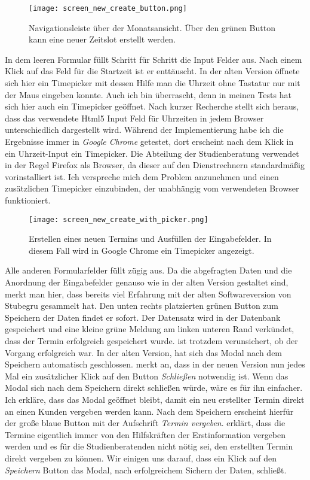 \begin{figure}[H]
    \caption{Navigationsleiste über der Monatsansicht. Über den grünen Button kann eine neuer Zeitslot erstellt werden.}
    \centering
    \texttt{[image: screen\_new\_create\_button.png]}
\end{figure}

In dem leeren Formular füllt \ipName Schritt für Schritt die Input Felder aus.
Nach einem Klick auf das Feld für die Startzeit ist er enttäuscht. In der alten
Version öffnete sich hier ein \gls{Timepicker} mit dessen Hilfe man die Uhrzeit
ohne Tastatur nur mit der Maus eingeben konnte. Auch ich bin überrascht, denn
in meinen Tests hat sich hier auch ein Timepicker geöffnet. Nach kurzer
Recherche stellt sich heraus, dass das verwendete Html5 Input Feld für
Uhrzeiten in jedem Browser unterschiedlich dargestellt
wird\cite{htmlTimeInput}. Während der Implementierung habe ich die Ergebnisse
immer in \textit{Google Chrome} getestet, dort erscheint nach dem Klick in ein
Uhrzeit-Input ein Timepicker. Die Abteilung der Studienberatung verwendet in
der Regel Firefox als Browser, da dieser auf den Dienstrechnern standardmäßig
vorinstalliert ist. Ich verspreche mich dem Problem anzunehmen und einen
zusätzlichen Timepicker einzubinden, der unabhängig vom verwendeten Browser
funktioniert.

\begin{figure}[H]
    \caption{Erstellen eines neuen Termins und Ausfüllen der Eingabefelder. In diesem Fall wird in Google Chrome ein Timepicker angezeigt.}
    \centering
    \texttt{[image: screen\_new\_create\_with\_picker.png]}
\end{figure}

Alle anderen Formularfelder füllt \ipName zügig aus. Da die abgefragten Daten
und die Anordnung der Eingabefelder genauso wie in der alten Version gestaltet
sind, merkt man hier, dass \ipName bereits viel Erfahrung mit der alten
Softwareversion von Stubegru gesammelt hat. Den unten rechts platzierten grünen
Button zum Speichern der Daten findet er sofort. Der Datensatz wird in der
Datenbank gespeichert und eine kleine grüne Meldung am linken unteren Rand
verkündet, dass der Termin erfolgreich gespeichert wurde. \ipName ist trotzdem
verunsichert, ob der Vorgang erfolgreich war. In der alten Version, hat sich
das Modal nach dem Speichern automatisch geschlossen. \ipName merkt an, dass in
der neuen Version nun jedes Mal ein zusätzlicher Klick auf den Button
\textit{Schließen} notwendig ist. Wenn das Modal sich nach dem Speichern direkt
schließen würde, wäre es für ihn einfacher. Ich erkläre, dass das Modal
geöffnet bleibt, damit ein neu erstellter Termin direkt an einen Kunden
vergeben werden kann. Nach dem Speichern erscheint hierfür der große blaue
Button mit der Aufschrift \textit{Termin vergeben}. \ipName erklärt, dass die
Termine eigentlich immer von den Hilfskräften der Erstinformation vergeben
werden und es für die Studienberatenden nicht nötig sei, den erstellten Termin
direkt vergeben zu können. Wir einigen uns darauf, dass ein Klick auf den
\textit{Speichern} Button das Modal, nach erfolgreichem Sichern der Daten,
schließt.

